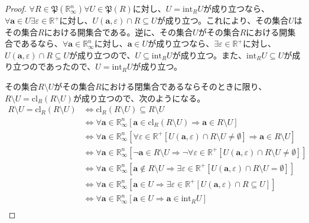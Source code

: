 \documentclass[dvipdfmx]{jsarticle}
\begin{document}
\begin{proof}
$\forall R \in \mathfrak{P}\left( \mathbb{R}_{\infty}^{n} \right)\forall U \in \mathfrak{P}(R)$に対し、$U = \mathrm{int}_{R}U$が成り立つなら、$\forall\mathbf{a} \in U\exists\varepsilon \in \mathbb{R}^{+}$に対し、$U\left( \mathbf{a},\varepsilon \right) \cap R \subseteq U$が成り立つ。これにより、その集合$U$はその集合$R$における開集合である。逆に、その集合$U$がその集合$R$における開集合であるなら、$\forall\mathbf{a} \in \mathbb{R}_{\infty}^{n}$に対し、$\mathbf{a} \in U$が成り立つなら、$\exists\varepsilon \in \mathbb{R}^{+}$に対し、$U\left( \mathbf{a},\varepsilon \right) \cap R \subseteq U$が成り立つので、$U \subseteq \mathrm{int}_{R}U$が成り立つ。また、$\mathrm{int}_{R}U \subseteq U$が成り立つのであったので、$U = \mathrm{int}_{R}U$が成り立つ。\par
その集合$R \setminus U$がその集合$R$における閉集合であるならそのときに限り、$R \setminus U = \mathrm{cl}_{R}(R \setminus U)$が成り立つので、次のようになる。
\begin{align*}
R \setminus U = \mathrm{cl}_{R}(R \setminus U) &\Leftrightarrow \mathrm{cl}_{R}(R \setminus U) \subseteq R \setminus U\\
&\Leftrightarrow \forall\mathbf{a} \in \mathbb{R}_{\infty}^{n}\left[ \mathbf{a} \in \mathrm{cl}_{R}(R \setminus U) \Rightarrow \mathbf{a} \in R \setminus U \right]\\
&\Leftrightarrow \forall\mathbf{a} \in \mathbb{R}_{\infty}^{n}\left[ \forall\varepsilon \in \mathbb{R}^{\mathbf{+}}\left[ U\left( \mathbf{a},\varepsilon \right) \cap R \setminus U \neq \emptyset \right] \Rightarrow \mathbf{a} \in R \setminus U \right]\\
&\Leftrightarrow \forall\mathbf{a} \in \mathbb{R}_{\infty}^{n}\left[ \neg\mathbf{a} \in R \setminus U \Rightarrow \neg\forall\varepsilon \in \mathbb{R}^{\mathbf{+}}\left[ U\left( \mathbf{a},\varepsilon \right) \cap R \setminus U \neq \emptyset \right] \right]\\
&\Leftrightarrow \forall\mathbf{a} \in \mathbb{R}_{\infty}^{n}\left[ \mathbf{a} \notin R \setminus U \Rightarrow \exists\varepsilon \in \mathbb{R}^{\mathbf{+}}\left[ U\left( \mathbf{a},\varepsilon \right) \cap R \setminus U = \emptyset \right] \right]\\
&\Leftrightarrow \forall\mathbf{a} \in \mathbb{R}_{\infty}^{n}\left[ \mathbf{a} \in U \Rightarrow \exists\varepsilon \in \mathbb{R}^{\mathbf{+}}\left[ U\left( \mathbf{a},\varepsilon \right) \cap R \subseteq U \right] \right]\\
&\Leftrightarrow \forall\mathbf{a} \in \mathbb{R}_{\infty}^{n}\left[ \mathbf{a} \in U \Rightarrow \mathbf{a} \in \mathrm{int}_{R}U \right]\\

\end{align*}
\end{proof}
\end{document}
